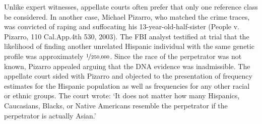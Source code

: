 \documentclass{article}
\begin{document}
 Unlike expert witnesses, appellate courts often prefer that only one reference class be considered.  
    In another case, Michael Pizarro, who matched the crime traces, was convicted of raping and suffocating his 13-year-old-half-sister (People v. Pizarro, %
 110 Cal.App.4th 530, 2003). %
The FBI analyst testified at trial that the likelihood of finding another unrelated Hispanic individual with the same genetic profile was approximately $\nicefrac{1}{250,000}$. Since the race of the perpetrator was not known, Pizarro appealed arguing that the DNA evidence was inadmissible. 
The appellate court sided with Pizarro and objected to the presentation of frequency estimates for the Hispanic population as well as frequencies for any other racial or ethnic groups. The court wrote: `It does not matter how many Hispanics, Caucasians, Blacks, or Native Americans resemble the perpetrator if the perpetrator is actually Asian.' %
%
%
%
\end{document}
